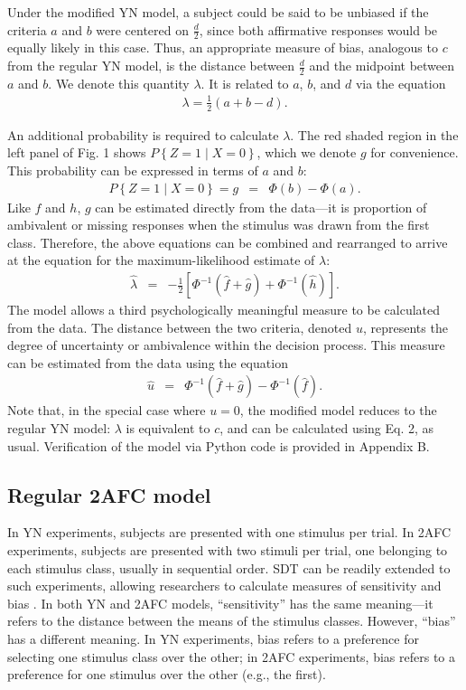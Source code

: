 \documentclass[man]{apa6}
\begin{document}
Under the modified YN model, a subject could be said to be unbiased if the criteria $a$ and $b$ were centered on $\frac{d}{2}$, since both affirmative responses would be equally likely in this case. Thus, an appropriate measure of bias, analogous to $c$ from the regular YN model, is the distance between $\frac{d}{2}$ and the midpoint between $a$ and $b$. We denote this quantity $\lambda$. It is related to $a$, $b$, and $d$ via the equation
\begin{eqnarray*}\lambda=\frac{1}{2}\left(a+b-d\right)\textrm{.}\end{eqnarray*}

An additional probability is required to calculate $\lambda$. The red shaded region in the left panel of Fig. 1 shows $P\left\{Z=1\mid{}X=0\right\}$, which we denote $g$ for convenience. This probability can be expressed in terms of $a$ and $b$:
\begin{eqnarray*}
P\left\{Z=1\mid{}X=0\right\}=g&=&\Phi\left(b\right)-\Phi\left(a\right)\textrm{.}
\end{eqnarray*}
Like $f$ and $h$, $g$ can be estimated directly from the data---it is proportion of ambivalent or missing responses when the stimulus was drawn from the first class. Therefore, the above equations can be combined and rearranged to arrive at the equation for the maximum-likelihood estimate of $\lambda$:
\begin{eqnarray}
\hat{\lambda}&=&-\frac{1}{2}\left[\Phi^{-1}\left(\hat{f}+\hat{g}\right)+\Phi^{-1}\left(\hat{h}\right)\right]\textrm{.}
\end{eqnarray}The model allows a third psychologically meaningful measure to be calculated from the data. The distance between the two criteria, denoted $u$, represents the degree of uncertainty or ambivalence within the decision process. This measure can be estimated from the data using the equation
\begin{eqnarray}
\hat{u}&=&\Phi^{-1}\left(\hat{f}+\hat{g}\right)-\Phi^{-1}\left(\hat{f}\right)\textrm{.}
\end{eqnarray}Note that, in the special case where $u=0$, the modified model reduces to the regular YN model: $\lambda$ is equivalent to $c$, and can be calculated using Eq. 2, as usual. Verification of the model via Python code is provided in Appendix B.

\subsection{Regular 2AFC model}
In YN experiments, subjects are presented with one stimulus per trial. In 2AFC experiments, subjects are presented with two stimuli per trial, one belonging to each stimulus class, usually in sequential order. SDT can be readily extended to such experiments, allowing researchers to calculate measures of sensitivity and bias  \parencite[e.g.,][]{decarloon2012}. In both YN and 2AFC models, ``sensitivity'' has the same meaning---it refers to the distance between the means of the stimulus classes. However, ``bias'' has a different meaning. In YN experiments, bias refers to a preference for selecting one stimulus class over the other; in 2AFC experiments, bias refers to a preference for one stimulus over the other (e.g., the first).
\end{document}
